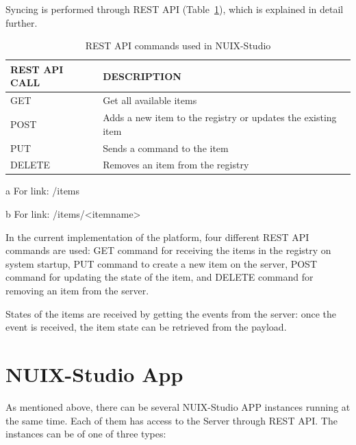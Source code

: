 Syncing is performed through REST API (Table~\ref{tab:rest-api-table}), which is explained in detail further.

\begin{table}
  \centering
  \begin{threeparttable}[c]
    \caption{REST API commands used in NUIX-Studio}
    \label{tab:rest-api-table}
    \begin{tabular}{ll}
      \toprule
      REST API CALL    &         DESCRIPTION                 \\
      \midrule
      GET\tnote{a} & Get all available items \\
      POST\tnote{b} & Adds a new item to the registry or updates the existing item    \\
      PUT\tnote{b}        & Sends a command to the item                              \\
      DELETE\tnote{b}        & Removes an item from the registry          \\
      \bottomrule
    \end{tabular}
    \begin{tablenotes}
      \item [a] For link: /items
      \item [b] For link: /items/<itemname>
    \end{tablenotes}
  \end{threeparttable}
\end{table}

In the current implementation of the platform, four different REST API commands are used: GET command for receiving the items in the registry on system startup, PUT command to create a new item on the server, POST command for updating the state of the item, and DELETE command for removing an item from the server.

States of the items are received by getting the events from the server: once the event is received, the item state can be retrieved from the payload.

\section{NUIX-Studio App}

As mentioned above, there can be several NUIX-Studio APP instances running at the same time. Each of them has access to the Server through REST API. The instances can be of one of three types:

